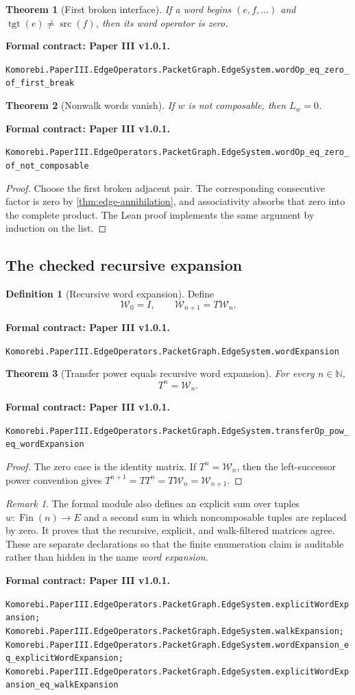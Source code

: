 \documentclass[11pt,a4paper]{article}
\newtheorem{theorem}{Theorem}[section]
\theoremstyle{plain}
\theoremstyle{definition}
\newtheorem{definition}[definition]{Definition}
\theoremstyle{remark}
\newtheorem{remark}[remark]{Remark}
\newcommand{\N}{\mathbb N}
\newcommand{\cW}{\mathcal W}
\newcommand{\src}{\operatorname{src}}
\newcommand{\tgt}{\operatorname{tgt}}
\newcommand{\leanname}[1]{\nolinkurl{#1}}
\newcommand{\statusleanthree}[1]{\par\smallskip\noindent\begin{minipage}{\linewidth}{\color{leanblue}\textbf{Formal contract: Paper III v1.0.1.}}\par\begingroup\small\raggedright\leanname{#1}\par\endgroup\end{minipage}\par\smallskip}
\begin{document}
\begin{theorem}[First broken interface]
\label{thm:first-break}
If a word begins $(e,f,\ldots)$ and $\tgt(e)\ne\src(f)$, then its word
operator is zero.
\end{theorem}
\statusleanthree{Komorebi.PaperIII.EdgeOperators.PacketGraph.EdgeSystem.wordOp_eq_zero_of_first_break}

\begin{theorem}[Nonwalk words vanish]
\label{thm:nonwalk-vanish}
If $w$ is not composable, then $L_w=0$.
\end{theorem}
\statusleanthree{Komorebi.PaperIII.EdgeOperators.PacketGraph.EdgeSystem.wordOp_eq_zero_of_not_composable}

\begin{proof}
Choose the first broken adjacent pair.  The corresponding consecutive factor
is zero by \cref{thm:edge-annihilation}, and associativity absorbs that zero
into the complete product.  The Lean proof implements the same argument by
induction on the list.
\end{proof}

\subsection{The checked recursive expansion}

\begin{definition}[Recursive word expansion]
\label{def:recursive-word-expansion}
Define
\[
  \cW_0=I,
  \qquad
  \cW_{n+1}=T\cW_n.
\]
\end{definition}
\statusleanthree{Komorebi.PaperIII.EdgeOperators.PacketGraph.EdgeSystem.wordExpansion}

\begin{theorem}[Transfer power equals recursive word expansion]
\label{thm:power-recursive-expansion}
For every $n\in\N$,
\[
  T^n=\cW_n.
\]
\end{theorem}
\statusleanthree{Komorebi.PaperIII.EdgeOperators.PacketGraph.EdgeSystem.transferOp_pow_eq_wordExpansion}

\begin{proof}
The zero case is the identity matrix.  If $T^n=\cW_n$, then the
left-successor power convention gives
$T^{n+1}=TT^n=T\cW_n=\cW_{n+1}$.
\end{proof}

\begin{remark}
The formal module also defines an explicit sum over tuples
$w:\operatorname{Fin}(n)\to E$ and a second sum in which noncomposable tuples
are replaced by zero.  It proves that the recursive, explicit, and
walk-filtered matrices agree.  These are separate declarations so that the
finite enumeration claim is auditable rather than hidden in the name
\emph{word expansion}.
\end{remark}
\statusleanthree{Komorebi.PaperIII.EdgeOperators.PacketGraph.EdgeSystem.explicitWordExpansion; Komorebi.PaperIII.EdgeOperators.PacketGraph.EdgeSystem.walkExpansion; Komorebi.PaperIII.EdgeOperators.PacketGraph.EdgeSystem.wordExpansion_eq_explicitWordExpansion; Komorebi.PaperIII.EdgeOperators.PacketGraph.EdgeSystem.explicitWordExpansion_eq_walkExpansion}
\end{document}
